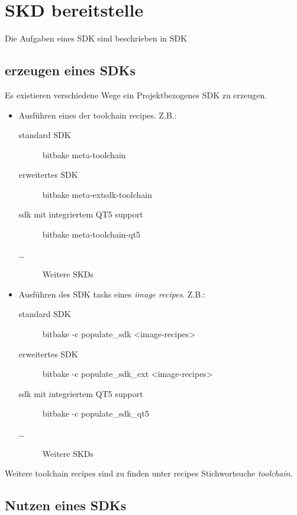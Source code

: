 \chapter{SKD bereitstelle}%

Die Aufgaben eines \ac{SDK} sind beschrieben in \gls{SDK}
\label{cha:skd_bereitstelle}


\section{erzeugen eines SDKs}%
\label{sec:erzeugen_eines_sdks}

Es existieren verschiedene Wege ein Projektbezogenes SDK zu erzeugen.


\begin{itemize}
    \item Ausführen eines der toolchain recipes. Z.B.:
        \begin{description}
            \item [standard SDK] bitbake meta-toolchain
            \item [erweitertes SDK] bitbake meta-extsdk-toolchain
            \item [sdk mit integriertem QT5 support] bitbake meta-toolchain-qt5
            \item [\ldots] Weitere SKDs
        \end{description}

    \item Ausführen des SDK tasks eines \textit{image recipes}. Z.B.:
        \begin{description}
            \item [standard SDK] bitbake -c populate\_sdk <image-recipes>
            \item [erweitertes SDK] bitbake -c populate\_sdk\_ext
                <image-recipes>
            \item [sdk mit integriertem QT5 support] bitbake -c
                populate\_sdk\_qt5
            \item [\ldots] Weitere SKDs
        \end{description}
\end{itemize}

Weitere toolchain recipes sind zu finden unter \cite{OEI} recipes
Stich\-wortsuche \textit{toolchain}.


\section{Nutzen eines SDKs}%
\label{sec:nutzen_eines_sdks}

